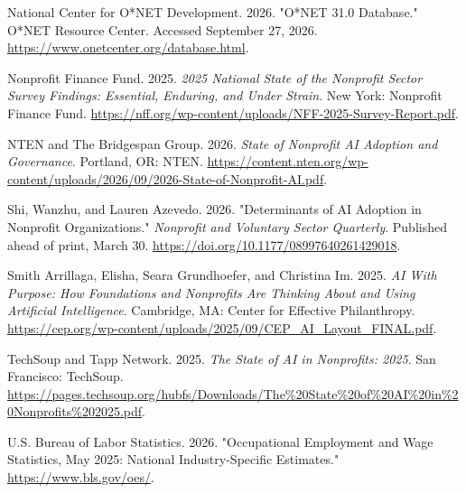 \begin{reflist}
\item National Center for O*NET Development. 2026. "O*NET 31.0 Database." O*NET Resource Center. Accessed September 27, 2026. \url{https://www.onetcenter.org/database.html}.

\item Nonprofit Finance Fund. 2025. \emph{2025 National State of the Nonprofit Sector Survey Findings: Essential, Enduring, and Under Strain}. New York: Nonprofit Finance Fund. \url{https://nff.org/wp-content/uploads/NFF-2025-Survey-Report.pdf}.

\item NTEN and The Bridgespan Group. 2026. \emph{State of Nonprofit AI Adoption and Governance}. Portland, OR: NTEN. \url{https://content.nten.org/wp-content/uploads/2026/09/2026-State-of-Nonprofit-AI.pdf}.

\item Shi, Wanzhu, and Lauren Azevedo. 2026. "Determinants of AI Adoption in Nonprofit Organizations." \emph{Nonprofit and Voluntary Sector Quarterly}. Published ahead of print, March 30. \url{https://doi.org/10.1177/08997640261429018}.

\item Smith Arrillaga, Elisha, Seara Grundhoefer, and Christina Im. 2025. \emph{AI With Purpose: How Foundations and Nonprofits Are Thinking About and Using Artificial Intelligence}. Cambridge, MA: Center for Effective Philanthropy. \url{https://cep.org/wp-content/uploads/2025/09/CEP_AI_Layout_FINAL.pdf}.

\item TechSoup and Tapp Network. 2025. \emph{The State of AI in Nonprofits: 2025}. San Francisco: TechSoup. \url{https://pages.techsoup.org/hubfs/Downloads/The\%20State\%20of\%20AI\%20in\%20Nonprofits\%202025.pdf}.

\item U.S. Bureau of Labor Statistics. 2026. "Occupational Employment and Wage Statistics, May 2025: National Industry-Specific Estimates." \url{https://www.bls.gov/oes/}.

\end{reflist}
